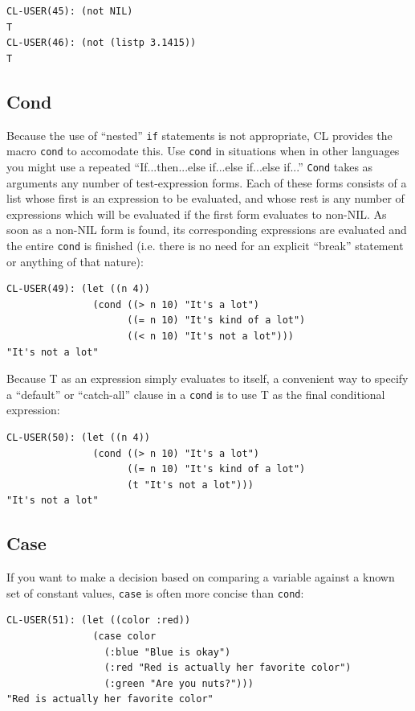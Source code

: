\begin{verbatim}
CL-USER(45): (not NIL)
T
CL-USER(46): (not (listp 3.1415))
T
\end{verbatim}

\subsection{Cond}

Because the use of ``nested'' \texttt{if} statements is not appropriate, CL provides the macro \texttt{cond} to
accomodate this. Use \texttt{cond} in situations when in other languages you might use a repeated
``If...then...else if...else if...else if...'' \texttt{Cond} takes as arguments any number of test-expression
forms. Each of these forms consists of a list whose first is an expression to be evaluated,
and whose rest is any number of expressions which will be evaluated if the first form
evaluates to non-NIL. As soon as a non-NIL form is found, its corresponding expressions
are evaluated and the entire \texttt{cond} is finished (i.e. there is no need for an explicit ``break''
statement or anything of that nature):

\begin{verbatim}
CL-USER(49): (let ((n 4))
               (cond ((> n 10) "It's a lot")
                     ((= n 10) "It's kind of a lot")
                     ((< n 10) "It's not a lot")))
"It's not a lot"
\end{verbatim}

Because T as an expression simply evaluates to itself, a convenient way to specify a ``default''
or ``catch-all'' clause in a \texttt{cond} is to use T as the final conditional expression:

\begin{verbatim}
CL-USER(50): (let ((n 4))
               (cond ((> n 10) "It's a lot")
                     ((= n 10) "It's kind of a lot")
                     (t "It's not a lot")))
"It's not a lot"
\end{verbatim}

\subsection{Case}

If you want to make a decision based on comparing a variable against a known set of
constant values, \texttt{case} is often more concise than \texttt{cond}:

\begin{verbatim}
CL-USER(51): (let ((color :red))
               (case color
                 (:blue "Blue is okay")
                 (:red "Red is actually her favorite color")
                 (:green "Are you nuts?")))
"Red is actually her favorite color"
\end{verbatim}

